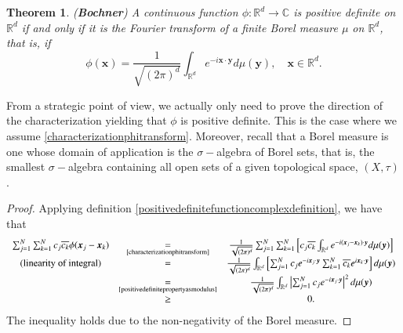 \documentclass[12pt]{report} %
\newtheorem{theorem}{Theorem}
\newcommand{\tmmathbf}[1]{\ensuremath{\boldsymbol{#1}}}
\newcommand{\tmstrong}[1]{\textbf{#1}}
\providecommand{\xequal}[2][]{\mathop{=}\limits_{#1}^{#2}}
\begin{document}
\begin{theorem}\label{tm-bochner}
  ({\tmstrong{Bochner}}) A continuous function $\phi : \mathbb{R}^d
  \rightarrow \mathbb{C}$ is positive definite on $\mathbb{R}^d$ if and only
  if it is the Fourier transform of a finite Borel measure $\mu$
  on $\mathbb{R}^d$, that is, if
  \begin{equation}
    \phi (\tmmathbf{x}) = \frac{1}{\sqrt{(2 \pi)^d}} \int_{\mathbb{R}^d} e^{-
    i\tmmathbf{x} \cdot \tmmathbf{y}} d \mu (\tmmathbf{y}), \quad \tmmathbf{x}
    \in \mathbb{R}^d . \label{characterizationphitransform}
  \end{equation}
\end{theorem}

From a strategic point of view, we actually only need to prove the direction of the characterization yielding that $\phi$ is positive definite. This is the case where we assume \eqref{characterizationphitransform}. Moreover, recall that a Borel measure is one whose domain of application is the $\sigma-$algebra of Borel sets, that is, the smallest $\sigma-$algebra containing all open sets of a given topological space, $(X,\tau)$. 

\begin{proof}
  Applying definition \eqref{positivedefinitefunctioncomplexdefinition}, we
  have that
  \[ \begin{array}{ccc}
       \sum_{j = 1}^N \sum_{k = 1}^N c_j \overline{c_k} \phi (\tmmathbf{x}_j
       -\tmmathbf{x}_k) &
       \xequal[\text{\eqref{characterizationphitransform}}]{} &
       \frac{1}{\sqrt{(2 \pi)^d}} \sum_{j = 1}^N \sum_{k = 1}^N \left[ c_j
       \overline{c_k} \int_{\mathbb{R}^d} e^{- i (\tmmathbf{x}_j
       -\tmmathbf{x}_k) \cdot \tmmathbf{y}} d \mu (\tmmathbf{y}) \right]\\
       \text{(linearity of integral)} & = & \frac{1}{\sqrt{(2 \pi)^d}}
       \int_{\mathbb{R}^d} \left[ \sum_{j = 1}^N c_j e^{- i\tmmathbf{x}_j
       \cdot \tmmathbf{y}} \sum_{k = 1}^N \overline{c_k} e^{i\tmmathbf{x}_k
       \cdot \tmmathbf{y}} \right] d \mu (\tmmathbf{y})\\
       & \xequal[\text{\eqref{positivedefinitepropertyasmodulus}}]{} &
       \frac{1}{\sqrt{(2 \pi)^d}} \int_{\mathbb{R}^d} \left| \sum_{j = 1}^N
       c_j e^{- i\tmmathbf{x}_j \cdot \tmmathbf{y}} \right|^2 d \mu
       (\tmmathbf{y})\\
       & \geq & 0.
     \end{array} \]
  The inequality holds due to the non-negativity of the Borel measure.
\end{proof}
\end{document}
